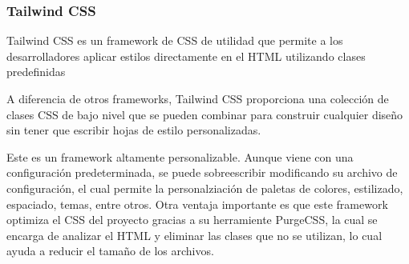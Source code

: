 \subsubsection{Tailwind CSS}
Tailwind CSS es un framework de CSS de utilidad que permite a los desarrolladores aplicar estilos directamente en el HTML utilizando clases predefinidas

A diferencia de otros frameworks, Tailwind CSS proporciona una colección de clases CSS de bajo nivel que se pueden combinar para construir cualquier diseño sin tener que escribir hojas de estilo personalizadas.

Este es un framework altamente personalizable. Aunque viene con una configuración predeterminada, se puede sobreescribir modificando su archivo de configuración, el cual permite la personalziación de paletas de colores, estilizado, espaciado, temas, entre otros. Otra ventaja importante es que este framework optimiza el CSS del proyecto gracias a su herramiente PurgeCSS, la cual se encarga de analizar el HTML y eliminar las clases que no se utilizan, lo cual ayuda a reducir el tamaño de los archivos.